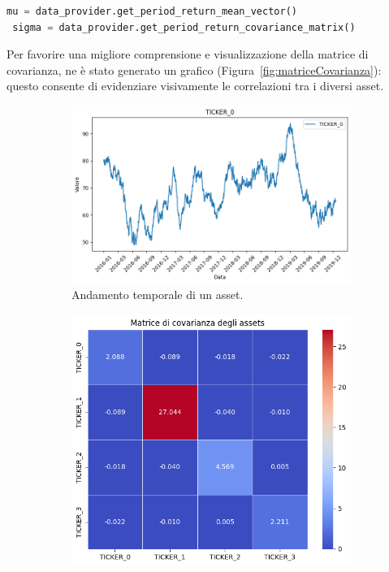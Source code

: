 \begin{lstlisting}[language=python, caption={Calcolo dei rendimenti attesi e della matrice di covarianza.}]
 mu = data_provider.get_period_return_mean_vector()
 sigma = data_provider.get_period_return_covariance_matrix()
\end{lstlisting}

Per favorire una migliore comprensione e visualizzazione della matrice di 
covarianza, ne è stato generato un grafico (Figura~\ref{fig:matriceCovarianza}): 
questo consente di evidenziare visivamente le correlazioni tra i diversi asset.

\begin{figure}[h!]
    \centering
    \begin{subfigure}{0.52\textwidth}
        \centering
        \includegraphics[width=\textwidth]{images/graficoAsset.png}
        \caption{Andamento temporale di un asset.}
        \label{fig:graficiAssets}
    \end{subfigure}
    \hfill
    \begin{subfigure}{0.45\textwidth}
        \centering
        \includegraphics[width=\textwidth]{images/matriceCovarianza.png}

\end{subfigure}
\end{figure}

